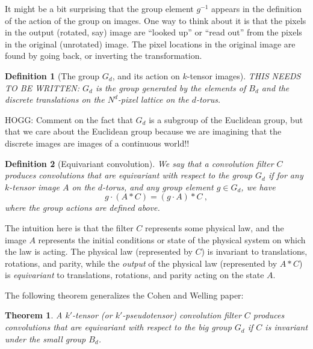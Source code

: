 \documentclass{article}
\theoremstyle{plain}
\newtheorem{definition}{Definition}
\newtheorem{theorem}{Theorem}
\begin{document}
It might be a bit surprising that the group element $g^{-1}$ appears in the definition of the action of the group on images.
One way to think about it is that the pixels in the output (rotated, say) image are ``looked up'' or ``read out'' from the pixels in the original (unrotated) image.
The pixel locations in the original image are found by going back, or inverting the transformation.

\begin{definition}[The group $G_d$, and its action on $k$-tensor images]
THIS NEEDS TO BE WRITTEN: $G_d$ is the group generated by the elements of $B_d$ and the discrete translations on the $N^d$-pixel lattice on the $d$-torus.
\end{definition}

HOGG: Comment on the fact that $G_d$ is a subgroup of the Euclidean group, but that we care about the Euclidean group because we are imagining that the discrete images are images of a continuous world!!

\begin{definition}[Equivariant convolution]
We say that a convolution filter $C$ produces convolutions that are equivariant with respect to the group $G_d$ if for any $k$-tensor image $A$ on the $d$-torus, and any group element $g\in G_d$, we have
\begin{equation}
    g\cdot (A\ast C) = (g\cdot A)\ast C ~,
\end{equation}
where the group actions are defined above.
\end{definition}

The intuition here is that the filter $C$ represents some physical law, and the image $A$ represents the initial conditions or state of the physical system on which the law is acting.
The physical law (represented by $C$) is invariant to translations, rotations, and parity, while the \emph{output} of the physical law (represented by $A\ast C$) is \emph{equivariant} to translations, rotations, and parity acting on the state $A$.


The following theorem generalizes the Cohen and Welling paper:

\begin{theorem}
A $k'$-tensor (or $k'$-pseudotensor) convolution filter $C$ produces convolutions that are equivariant with respect to the big group $G_d$ if $C$ is invariant under the small group $B_d$.
\end{theorem}
\end{document}
